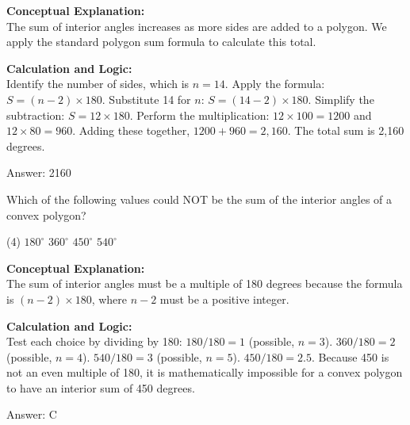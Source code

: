 \documentclass[11pt,paper=a4,answers]{exam}
\begin{document}
\begin{questions}
\begin{solution}
\textbf{Conceptual Explanation:} \\
The sum of interior angles increases as more sides are added to a polygon. We apply the standard polygon sum formula to calculate this total.

\vspace{30pt}

\textbf{Calculation and Logic:} \\
Identify the number of sides, which is $n = 14$. Apply the formula: $S = (n - 2) \times 180$. Substitute 14 for $n$: $S = (14 - 2) \times 180$. Simplify the subtraction: $S = 12 \times 180$. Perform the multiplication: $12 \times 100 = 1200$ and $12 \times 80 = 960$. Adding these together, $1200 + 960 = 2,160$. The total sum is 2,160 degrees.

\vspace{30pt}

Answer: \colorbox{yellow!100}{2160}
\end{solution}

\vspace{60pt}

\question
Which of the following values could NOT be the sum of the interior angles of a convex polygon?
\begin{tasks}(4)
    \task $180^\circ$
    \task $360^\circ$
    \task $450^\circ$
    \task $540^\circ$
\end{tasks}

\begin{solution}
\textbf{Conceptual Explanation:} \\
The sum of interior angles must be a multiple of 180 degrees because the formula is $(n-2) \times 180$, where $n-2$ must be a positive integer.

\vspace{30pt}

\textbf{Calculation and Logic:} \\
Test each choice by dividing by 180:
$180 / 180 = 1$ (possible, $n=3$).
$360 / 180 = 2$ (possible, $n=4$).
$540 / 180 = 3$ (possible, $n=5$).
$450 / 180 = 2.5$.
Because 450 is not an even multiple of 180, it is mathematically impossible for a convex polygon to have an interior sum of 450 degrees.

\vspace{30pt}

Answer: \colorbox{yellow!100}{C}
\end{solution}


\end{questions}
\end{document}
